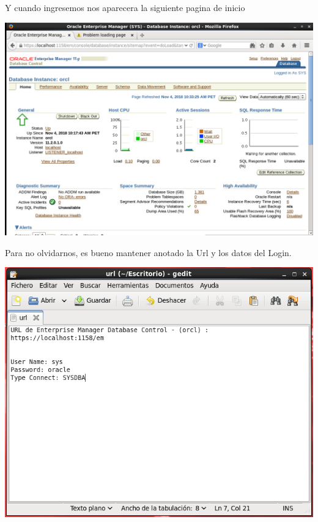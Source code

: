 Y cuando ingresemos nos aparecera la siguiente pagina de inicio
\begin{center}
	\includegraphics[width=15cm]{./Imagenes/93} 
\end{center}

Para no olvidarnos, es bueno mantener anotado la Url y los datos del Login.
\begin{center}
	\includegraphics[width=15cm]{./Imagenes/94} 
\end{center}

